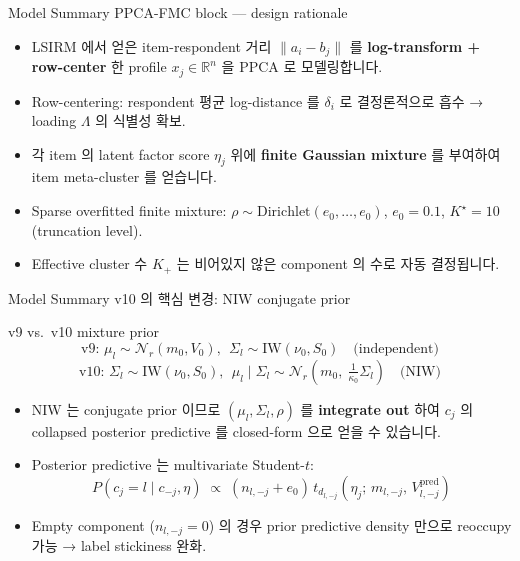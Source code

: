 \documentclass{beamer}
\begin{document}
\begin{frame}{Model Summary}
{PPCA-FMC block --- design rationale}

\begin{itemize}
    \item LSIRM 에서 얻은 item-respondent 거리 $\|a_i - b_j\|$ 를 \textbf{log-transform + row-center} 한 profile $x_j \in \mathbb{R}^n$ 을 PPCA 로 모델링합니다.
    \item Row-centering: respondent 평균 log-distance 를 $\delta_i$ 로 결정론적으로 흡수 → loading $\Lambda$ 의 식별성 확보.
    \item 각 item 의 latent factor score $\eta_j$ 위에 \textbf{finite Gaussian mixture} 를 부여하여 item meta-cluster 를 얻습니다.
    \item Sparse overfitted finite mixture: $\rho \sim \mathrm{Dirichlet}(e_0, \dots, e_0)$, $e_0 = 0.1$, $K^\star = 10$ (truncation level).
    \item Effective cluster 수 $K_+$ 는 비어있지 않은 component 의 수로 자동 결정됩니다.
\end{itemize}
\end{frame}

\begin{frame}{Model Summary}
{v10 의 핵심 변경: NIW conjugate prior}

\begin{block}{v9 vs.\ v10 mixture prior}
\[
\text{v9: } \mu_l \sim \mathcal{N}_r(m_0, V_0),\ \ \Sigma_l \sim \mathrm{IW}(\nu_0, S_0) \quad \text{(independent)}
\]
\[
\text{v10: } \Sigma_l \sim \mathrm{IW}(\nu_0, S_0),\ \ \mu_l \mid \Sigma_l \sim \mathcal{N}_r\!\left(m_0,\ \tfrac{1}{\kappa_0}\Sigma_l\right) \quad \text{(NIW)}
\]
\end{block}

\begin{itemize}
    \item NIW 는 conjugate prior 이므로 $(\mu_l, \Sigma_l, \rho)$ 를 \textbf{integrate out} 하여 $c_j$ 의 collapsed posterior predictive 를 closed-form 으로 얻을 수 있습니다.
    \item Posterior predictive 는 multivariate Student-$t$:
    \[
        P(c_j = l \mid c_{-j}, \eta) \;\propto\; (n_{l,-j} + e_0)\, t_{d_{l,-j}}\!\left(\eta_j;\, m_{l,-j},\, V^{\mathrm{pred}}_{l,-j}\right)
    \]
    \item Empty component ($n_{l,-j}=0$) 의 경우 prior predictive density 만으로 reoccupy 가능 → label stickiness 완화.
\end{itemize}
\end{frame}
\end{document}
